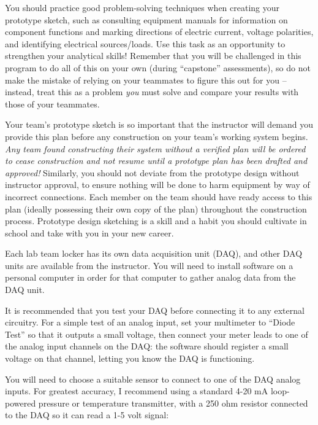 \documentclass[12pt,a4paper]{article}
\begin{document}
\begin{itemize}
You should practice good problem-solving techniques when creating your prototype sketch, such as consulting equipment manuals for information on component functions and marking directions of electric current, voltage polarities, and identifying electrical sources/loads.  Use this task as an opportunity to strengthen your analytical skills!  Remember that you will be challenged in this program to do all of this on your own (during ``capstone'' assessments), so do not make the mistake of relying on your teammates to figure this out for you -- instead, treat this as a problem {\it you} must solve and compare your results with those of your teammates.

Your team's prototype sketch is so important that the instructor will demand you provide this plan before any construction on your team's working system begins.  {\it Any team found constructing their system without a verified plan will be ordered to cease construction and not resume until a prototype plan has been drafted and approved!}  Similarly, you should not deviate from the prototype design without instructor approval, to ensure nothing will be done to harm equipment by way of incorrect connections.  Each member on the team should have ready access to this plan (ideally possessing their own copy of the plan) throughout the construction process.  Prototype design sketching is a skill and a habit you should cultivate in school and take with you in your new career.

\vskip 10pt

Each lab team locker has its own data acquisition unit (DAQ), and other DAQ units are available from the instructor.  You will need to install software on a personal computer in order for that computer to gather analog data from the DAQ unit.

It is recommended that you test your DAQ before connecting it to any external circuitry.  For a simple test of an analog input, set your multimeter to ``Diode Test'' so that it outputs a small voltage, then connect your meter leads to one of the analog input channels on the DAQ: the software should register a small voltage on that channel, letting you know the DAQ is functioning.

\vskip 10pt

You will need to choose a suitable sensor to connect to one of the DAQ analog inputs.  For greatest accuracy, I recommend using a standard 4-20 mA loop-powered pressure or temperature transmitter, with a 250 ohm resistor connected to the DAQ so it can read a 1-5 volt signal:


\end{itemize}
\end{document}
